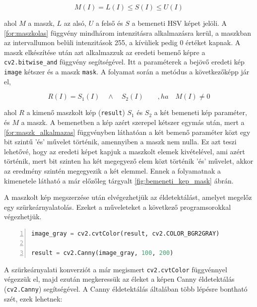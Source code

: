 \begin{equation}
    M(I) = L(I) \le S(I) \le U(I)
    \label{for:maszkolas}
\end{equation}

\par ahol $M$ a maszk, $L$ az alsó, $U$ a felső és $S$ a bemeneti HSV képet jelöli. A \ref{for:maszkolas} függvény mindhárom intenzitásra alkalmazásra kerül, a maszkban az intervallumon belüli intenzitások 255, a kívüliek pedig 0 értéket kapnak. A maszk elkészítése után azt alkalmazzuk az eredeti bemenő képre a \lstinline{cv2.bitwise_and} függvény \cite{cv2_bitwise_and} segítségével. Itt a paraméterek a bejövő eredeti kép \lstinline{image} kétszer és a maszk \lstinline{mask}.
\newline A folyamat során a metódus a következőképp jár el,

\begin{equation}
    R(I) = S_1(I)\quad \land\quad S_2(I)\qquad ,ha\quad M(I) \ne 0
    \label{for:maszk_alkalmazas}
\end{equation}

\par ahol $R$ a kimenő maszkolt kép (\lstinline{result}) $S_1$ és $S_2$ a két bemeneti kép paraméter, és $M$ a maszk. A bemenetben a kép azért szerepel kétszer egymás után, mert a \ref{for:maszk_alkalmazas} függvényben láthatóan a két bemenő paraméter közt egy bit szintű 'és' művelet történik, amennyiben a maszk nem nulla. Ez azt teszi lehetővé, hogy az eredeti képet kapjuk a maszkolt elemek kivételével, ami azért történik, mert bit szinten ha két megegyező elem közt történik 'és' művelet, akkor az eredmény szintén megegyezik a két elemmel. Ennek a folyamatnak a kimenetele látható a már előzőleg tárgyalt \ref{fig:bemeneti_kep_mask} ábrán.
\par A maszkolt kép megszerzése után elvégezhetjük az éldetektálást, amelyet megelőz egy szürkeárnyalatolás.
\newline Ezeket a műveleteket a következő programsorokkal végezhetjük.

\vspace{2mm}\begin{lstlisting}[language=Python, numbers=left]
image_gray = cv2.cvtColor(result, cv2.COLOR_BGR2GRAY)

result = cv2.Canny(image_gray, 100, 200)
\end{lstlisting}

\par A szürkeárnyalati konverziót a már megismert \lstinline{cv2.cvtColor} függvénnyel \cite{cv2_cvt_color} végezzük el, majd ezután megkeressük az éleket a képen Canny éldetektálás \cite{cv2_canny,canny_edge_detection} (\lstinline{cv2.Canny}) segítségével.
\newline A Canny éldetektálás általában több lépésre bontható szét, ezek lehetnek:

